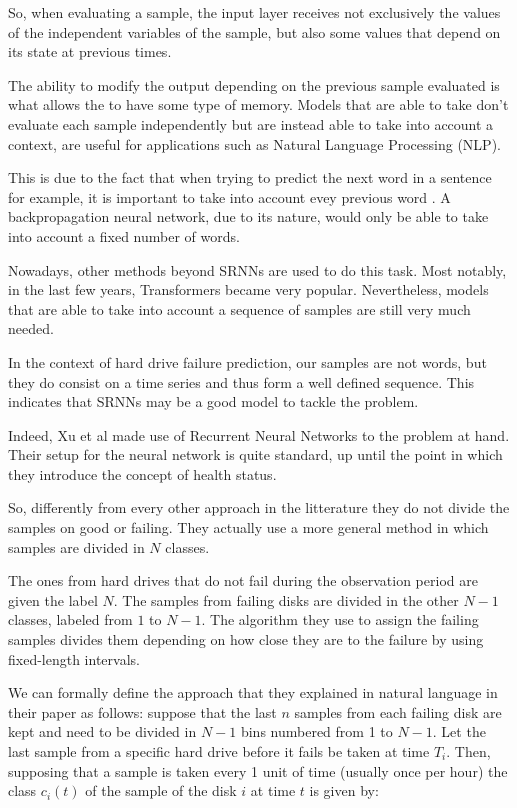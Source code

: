 So, when evaluating a sample, the input layer receives not exclusively the values of the independent variables of the sample, but also some values that depend on its state at previous times.

The ability to modify the output depending on the previous sample evaluated is what allows the to have some type of memory.
Models that are able to take don't evaluate each sample independently but are instead able to take into account a context, are useful for applications such as Natural Language Processing (NLP).

This is due to the fact that when trying to predict the next word in a sentence for example, it is important to take into account evey previous word \cite{tarwani2017survey}.
A backpropagation neural network, due to its nature, would only be able to take into account a fixed number of words.

Nowadays, other methods beyond SRNNs are used to do this task.
Most notably, in the last few years, Transformers\cite{vaswani2017attention} became very popular.
Nevertheless, models that are able to take into account a sequence of samples are still very much needed.

In the context of hard drive failure prediction, our samples are not words, but they do consist on a time series and thus form a well defined sequence.
This indicates that SRNNs may be a good model to tackle the problem.

Indeed, Xu et al \cite{Xu16} made use of Recurrent Neural Networks to the problem at hand.
Their setup for the neural network is quite standard, up until the point in which they introduce the concept of health status.

So, differently from every other approach in the litterature they do not divide the samples on good or failing.
They actually use a more general method in which samples are divided in $N$ classes.

The ones from hard drives that do not fail during the observation period are given the label $N$.
The samples from failing disks are divided in the other $N-1$ classes, labeled from $1$ to $N-1$.
The algorithm they use to assign the failing samples divides them depending on how close they are to the failure by using fixed-length intervals.

We can formally define the approach that they explained in natural language in their paper as follows:
suppose that the last $n$ samples from each failing disk are kept and need to be divided in $N-1$ bins numbered from 1 to $N-1$.
Let the last sample from a specific hard drive before it fails be taken at time $T_i$.
Then, supposing that a sample is taken every 1 unit of time (usually once per hour) the class $c_i(t)$ of the sample of the disk $i$ at time $t$ is given by:

